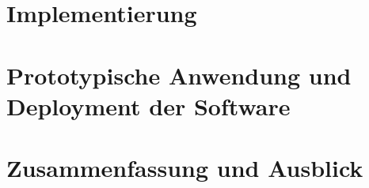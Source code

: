 \documentclass[a4paper,12pt,headsepline]{article}
\begin{document}
\section{Implementierung}
\section{Prototypische Anwendung und Deployment der Software}
\section{Zusammenfassung und Ausblick}
\newpage

\setcounter{page}{3}


\newpage
\end{document}
